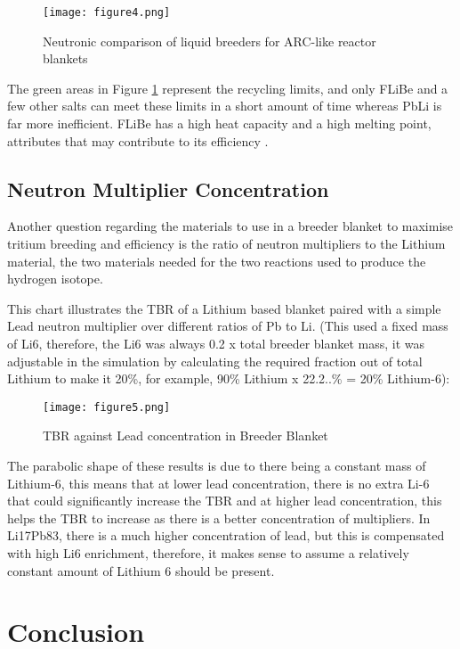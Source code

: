 \documentclass{article}
\begin{document}
\begin{figure}[hbt!]
  \centering
  \texttt{[image: figure4.png]}
  \caption{Neutronic comparison of liquid breeders for ARC-like reactor blankets \cite{SEGANTIN2020112013}}
  \label{fig:fig4}
\end{figure}

The green areas in Figure \ref{fig:fig4} represent the recycling limits, and only FLiBe and a few other salts can meet these limits in a short amount of time whereas PbLi is far more inefficient. FLiBe has a high heat capacity and a high melting point, attributes that may contribute to its efficiency \cite{SEGANTIN2020112013}.

\subsection{Neutron Multiplier Concentration}

Another question regarding the materials to use in a breeder blanket to maximise tritium breeding and efficiency is the ratio of neutron multipliers to the Lithium material, the two materials needed for the two reactions used to produce the hydrogen isotope.

This chart illustrates the TBR of a Lithium based blanket paired with a simple Lead neutron multiplier over different ratios of Pb to Li. (This used a fixed mass of Li6, therefore, the Li6 was always 0.2 x total breeder blanket mass, it was adjustable in the simulation by calculating the required fraction out of total Lithium to make it 20\%, for example, 90\% Lithium x 22.2..\% = 20\% Lithium-6):

\begin{figure}[hbt!]
  \centering
  \texttt{[image: figure5.png]}
  \caption{TBR against Lead concentration in Breeder Blanket}
  \label{fig:fig5}
\end{figure}


The parabolic shape of these results is due to there being a constant mass of Lithium-6, this means that at lower lead concentration, there is no extra Li-6 that could significantly increase the TBR and at higher lead concentration, this helps the TBR to increase as there is a better concentration of multipliers. In Li17Pb83, there is a much higher concentration of lead, but this is compensated with high Li6 enrichment, therefore, it makes sense to assume a relatively constant amount of Lithium 6 should be present.

\section{Conclusion}
\end{document}
